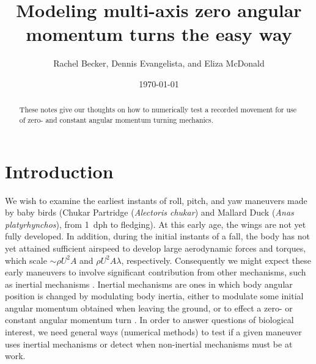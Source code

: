 \documentclass{amsart}
\title{Modeling multi-axis zero angular momentum turns the easy way}
\author{Rachel Becker, Dennis Evangelista, and Eliza McDonald}
\date{\today}
\begin{document}
\begin{abstract}
These notes give our thoughts on how to numerically test a recorded movement for use of zero- and constant angular momentum turning mechanics. 
\end{abstract}
\maketitle
\tableofcontents

\section{Introduction}
We wish to examine the earliest instants of roll, pitch, and yaw maneuvers made by baby birds (Chukar Partridge (\emph{Alectoris chukar}) and Mallard Duck (\emph{Anas platyrhynchos}), from \SI{1}{dph} to fledging).  At this early age, the wings are not yet fully developed.  In addition, during the initial instants of a fall, the body has not yet attained sufficient airspeed to develop large aerodynamic forces and torques, which scale $\sim \rho U^2 A$ and $\rho U^2 A \lambda$, respectively.  Consequently we might expect these early maneuvers to involve significant contribution from other mechanisms, such as inertial mechanisms \cite{Edwards:1986, Jusufi:2008, Jusufi:2010}.  Inertial mechanisms are ones in which body angular position is changed by modulating body inertia, either to modulate some initial angular momentum obtained when leaving the ground, or to effect a zero- or constant angular momentum turn \cite{Edwards:1986}.  In order to answer questions of biological interest, we need general ways (numerical methods) to test if a given maneuver uses inertial mechanisms or detect when non-inertial mechanisms must be at work. 
\end{document}
